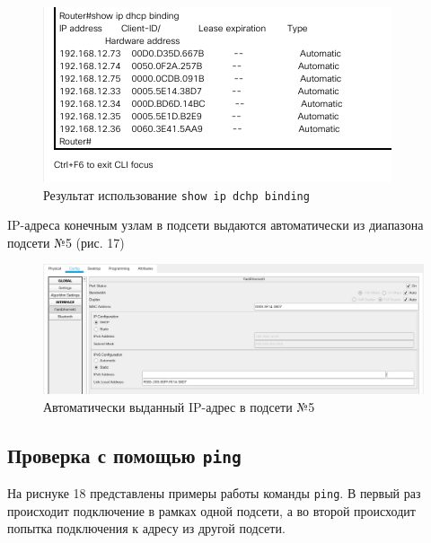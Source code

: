 \documentclass[12pt]{report}
\begin{document}
\begin{figure}[H]
	\begin{center}
		\includegraphics[scale=0.8]{img/16.png}
	\end{center}
	\caption{Результат использование \texttt{show ip dchp binding}}
	\label{fig:16}
\end{figure}

IP-адреса конечным узлам в подсети выдаются автоматически из диапазона подсети №5 (рис. 17)

\begin{figure}[H]
	\begin{center}
		\includegraphics[scale=0.4]{img/17.png}
	\end{center}
	\caption{Автоматически выданный IP-адрес в подсети №5}
	\label{fig:17}
\end{figure}

\subsection*{Проверка с помощью \texttt{ping}}

На риснуке 18 представлены примеры работы команды \texttt{ping}. В первый раз происходит подключение в рамках одной подсети, а во второй происходит попытка подключения к адресу из другой подсети. 
\end{document}
